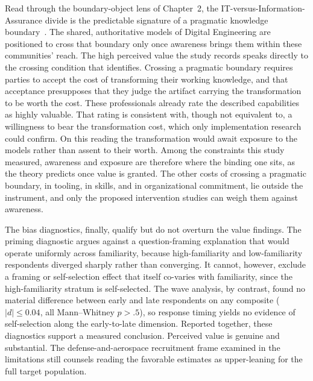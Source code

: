 Read through the boundary-object lens of Chapter~2, the IT-versus-Information-Assurance divide is the predictable signature of a pragmatic knowledge boundary~\parencite{Star_Griesemer_1989, Carlile_2002, Carlile_2004}. The shared, authoritative models of Digital Engineering are positioned to cross that boundary only once awareness brings them within these communities' reach. The high perceived value the study records speaks directly to the crossing condition that \citeauthor{Carlile_2004} identifies. Crossing a pragmatic boundary requires parties to accept the cost of transforming their working knowledge, and that acceptance presupposes that they judge the artifact carrying the transformation to be worth the cost. These professionals already rate the described capabilities as highly valuable. That rating is consistent with, though not equivalent to, a willingness to bear the transformation cost, which only implementation research could confirm. On this reading the transformation would await exposure to the models rather than assent to their worth. Among the constraints this study measured, awareness and exposure are therefore where the binding one sits, as the theory predicts once value is granted. The other costs of crossing a pragmatic boundary, in tooling, in skills, and in organizational commitment, lie outside the instrument, and only the proposed intervention studies can weigh them against awareness.

The bias diagnostics, finally, qualify but do not overturn the value findings. The priming diagnostic argues against a question-framing explanation that would operate uniformly across familiarity, because high-familiarity and low-familiarity respondents diverged sharply rather than converging. It cannot, however, exclude a framing or self-selection effect that itself co-varies with familiarity, since the high-familiarity stratum is self-selected. The wave analysis, by contrast, found no material difference between early and late respondents on any composite ($|d| \leq 0.04$, all Mann--Whitney $p > .5$), so response timing yields no evidence of self-selection along the early-to-late dimension. Reported together, these diagnostics support a measured conclusion. Perceived value is genuine and substantial. The defense-and-aerospace recruitment frame examined in the limitations still counsels reading the favorable estimates as upper-leaning for the full target population.

